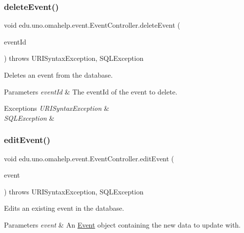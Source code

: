 \subsubsection{\texorpdfstring{delete\+Event()}{deleteEvent()}}
{\footnotesize\ttfamily void edu.\+uno.\+omahelp.\+event.\+Event\+Controller.\+delete\+Event (\begin{DoxyParamCaption}\item[{@Request\+Param int}]{event\+Id }\end{DoxyParamCaption}) throws U\+R\+I\+Syntax\+Exception, S\+Q\+L\+Exception}

Deletes an event from the database.


\begin{DoxyParams}{Parameters}
{\em event\+Id} & The event\+Id of the event to delete. \\
\hline
\end{DoxyParams}

\begin{DoxyExceptions}{Exceptions}
{\em U\+R\+I\+Syntax\+Exception} & \\
\hline
{\em S\+Q\+L\+Exception} & \\
\hline
\end{DoxyExceptions}
\mbox{\label{classedu_1_1uno_1_1omahelp_1_1event_1_1_event_controller_a69f49a3dd69d82c705e0de3566832d0b}} 
\subsubsection{\texorpdfstring{edit\+Event()}{editEvent()}}
{\footnotesize\ttfamily void edu.\+uno.\+omahelp.\+event.\+Event\+Controller.\+edit\+Event (\begin{DoxyParamCaption}\item[{@Request\+Body \mbox{\hyperlink{classedu_1_1uno_1_1omahelp_1_1event_1_1_event}{Event}}}]{event }\end{DoxyParamCaption}) throws U\+R\+I\+Syntax\+Exception, S\+Q\+L\+Exception}

Edits an existing event in the database.


\begin{DoxyParams}{Parameters}
{\em event} & An \mbox{\hyperlink{classedu_1_1uno_1_1omahelp_1_1event_1_1_event}{Event}} object containing the new data to update with. \\
\hline
\end{DoxyParams}

